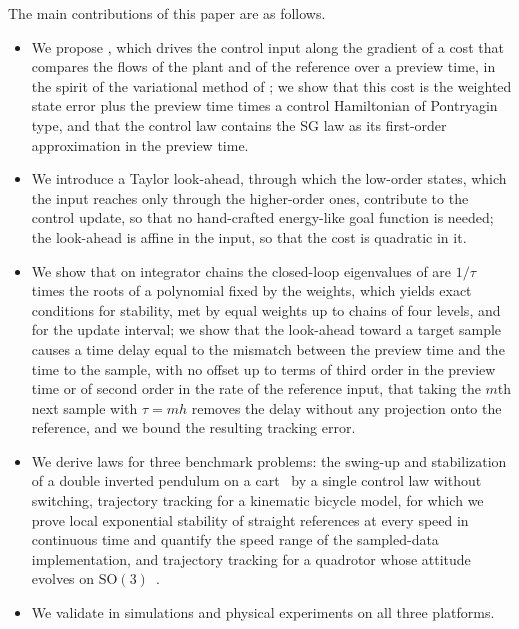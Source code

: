 The main contributions of this paper are as follows.
\begin{itemize}
    \item We propose \method{}, which drives the control input along the gradient of a cost that
    compares the flows of the plant and of the reference over a preview time, in the spirit of the
    variational method of \citet{lan2004variational}; we show that this cost is the weighted state
    error plus the preview time times a control Hamiltonian of Pontryagin type, and that the control
    law contains the SG law as its first-order approximation in the preview time.
    \item We introduce a Taylor look-ahead, through which the low-order states, which the input
    reaches only through the higher-order ones, contribute to the control update, so that no
    hand-crafted energy-like goal function is needed; the look-ahead is affine in the input, so
    that the cost is quadratic in it.
    \item We show that on integrator chains the closed-loop eigenvalues of \method{} are $1/\tau$
    times the roots of a polynomial fixed by the weights, which yields exact conditions for
    stability, met by equal weights up to chains of four levels, and for the update interval; we
    show that the look-ahead toward a target sample causes a time delay equal to the mismatch
    between the preview time and the time to the sample, with no offset up to terms of third order
    in the preview time or of second order in the rate of the reference input, that taking the $m$th
    next sample with $\tau = mh$ removes the delay without any projection onto the reference, and we
    bound the resulting tracking error.
    \item We derive \method{} laws for three benchmark problems: the swing-up and stabilization of a
    double inverted pendulum on a cart~\citep{graichen2007swingup} by a single control law
    without switching, trajectory tracking for a kinematic bicycle model, for which we prove local
    exponential stability of straight references at every speed in continuous time and quantify the
    speed range of the sampled-data implementation, and trajectory tracking for a
    quadrotor whose attitude evolves on $\mathrm{SO}(3)$~\citep{lee2010geometric}.
    \item We validate \method{} in simulations and physical experiments on all three platforms.
\end{itemize}

